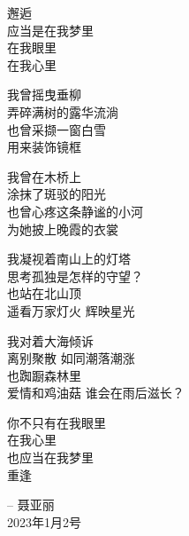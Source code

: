 



\begin{adjustwidth}{4em}{0em}


\begin{flushleft}
邂逅 \\
应当是在我梦里 \\
在我眼里 \\
在我心里 \\
\vspace{0.5cm}

我曾摇曳垂柳 \\
弄碎满树的露华流淌 \\
也曾采撷一窗白雪 \\ 
用来装饰镜框 \\
\vspace{0.5cm}

我曾在木桥上  \\
涂抹了斑驳的阳光 \\
也曾心疼这条静谧的小河 \\
为她披上晚霞的衣裳 \\
\vspace{0.5cm}

我凝视着南山上的灯塔 \\
思考孤独是怎样的守望？ \\
也站在北山顶 \\
遥看万家灯火 \quad 辉映星光 \\
\vspace{0.5cm}

我对着大海倾诉 \\
离别聚散 \quad 如同潮落潮涨 \\
也踟蹰森林里 \\  
爱情和鸡油菇 \quad 谁会在雨后滋长？\\
\vspace{0.5cm}

你不只有在我眼里 \\
在我心里 \\
也应当在我梦里 \\
重逢 \\

\end{flushleft}

\end{adjustwidth}
\begin{adjustwidth}{23em}{0em}
 \hspace{1.3em}-- 聂亚丽 
\\2023年1月2号 
\end{adjustwidth}